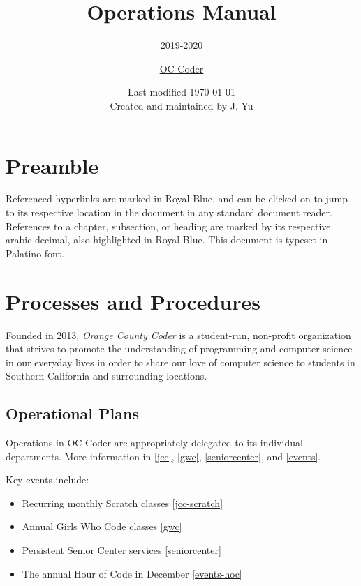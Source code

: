 \documentclass[twoside,11pt,letterpaper,abstracton]{scrartcl}
\title{Operations Manual}
\subtitle{2019-2020}
\author{\normalsize{\href{https://occoder.org}{OC Coder}}}
\date{\normalsize{Last modified \today \\ \small{Created and maintained by J. Yu}}}
\begin{document}
\thispagestyle{empty}

\maketitle

\section*{Preamble}

Referenced hyperlinks are marked in \color{RoyalBlue} Royal Blue\color{Black}, and can be clicked on to jump to its respective location in the document in any standard document reader. References to a chapter, subsection, or heading are marked by its respective arabic decimal, also highlighted in \color{RoyalBlue} Royal Blue\color{Black}. This document is typeset in Palatino font.

\tableofcontents

\newpage

\section{Processes and Procedures}

Founded in 2013, \emph{Orange County Coder} is a student-run, non-profit organization that strives to promote the understanding of programming and computer science in our everyday lives in order to share our love of computer science to students in Southern California and  surrounding locations.

\subsection{Operational Plans}

Operations in OC Coder are appropriately delegated to its individual departments. More information in \ref{jcc}, \ref{gwc}, \ref{seniorcenter}, and \ref{events}.

Key events include:
\begin{itemize}
    \item Recurring monthly Scratch classes     \ref{jcc-scratch}
    \item Annual Girls Who Code classes         \ref{gwc}
    \item Persistent Senior Center services     \ref{seniorcenter}
    \item The annual Hour of Code in December   \ref{events-hoc}
\end{itemize}
\end{document}
